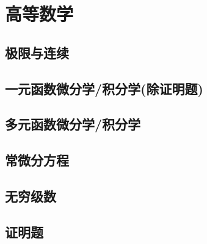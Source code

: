 \documentclass[12pt, a4paper, oneside, UTF8]{ctexbook}
\begin{document}
% 
\else
\fi
\chapter{高等数学}

\section{极限与连续}

\section{一元函数微分学/积分学(除证明题)}

\section{多元函数微分学/积分学}

\section{常微分方程}

\section{无穷级数}


\section{证明题}
\ifx\allfiles\undefined
\end{document}
